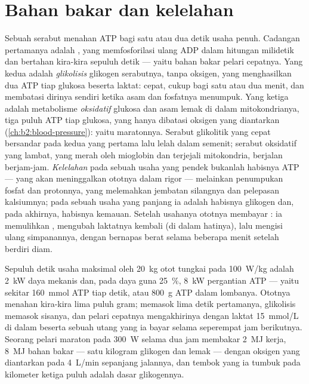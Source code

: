 \section{Bahan bakar dan kelelahan}

\begin{proposition}\label{prop:b2:muscle-movement:energy}
Sebuah serabut menahan ATP bagi satu atau dua detik usaha penuh.
Cadangan pertamanya adalah \emph{}, yang memfosforilasi
ulang ADP dalam hitungan milidetik dan bertahan kira-kira sepuluh detik
--- yaitu bahan bakar pelari cepatnya. Yang kedua adalah
\emph{glikolisis} glikogen serabutnya, tanpa oksigen, yang menghasilkan
dua ATP tiap glukosa beserta laktat: cepat, cukup bagi satu atau dua
menit, dan membatasi dirinya sendiri ketika asam dan fosfatnya
menumpuk. Yang ketiga adalah metabolisme \emph{oksidatif} glukosa dan
asam lemak di dalam mitokondrianya, tiga puluh ATP tiap glukosa, yang
hanya dibatasi oksigen yang diantarkan 
(\cref{ch:b2:blood-pressure}): yaitu maratonnya. Serabut glikolitik
yang cepat bersandar pada kedua yang pertama lalu lelah dalam semenit;
serabut oksidatif yang lambat, yang merah oleh mioglobin dan terjejali
mitokondria, berjalan berjam-jam. \emph{Kelelahan} pada sebuah usaha
yang pendek bukanlah habisnya ATP --- yang akan meninggalkan ototnya
dalam rigor --- melainkan penumpukan fosfat dan protonnya, yang
melemahkan jembatan silangnya dan pelepasan kalsiumnya; pada sebuah
usaha yang panjang ia adalah habisnya glikogen dan, pada akhirnya,
habisnya kemauan. Setelah usahanya ototnya membayar \emph{}: ia memulihkan , mengubah laktatnya
kembali (di dalam hatinya), lalu mengisi ulang simpanannya, dengan
bernapas berat selama beberapa menit setelah berdiri diam.
\end{proposition}

\begin{example}\label{ex:b2:muscle-movement:sprint}
Sepuluh detik usaha maksimal oleh \qty{20}{kg} otot tungkai pada
\qty{100}{W/kg} adalah \qty{2}{kW} daya mekanis dan, pada daya guna
\qty{25}{\%}, \qty{8}{kW} pergantian ATP --- yaitu sekitar
\qty{160}{mmol} ATP tiap detik, atau \qty{800}{g} ATP dalam lombanya.
Ototnya menahan kira-kira lima puluh gram;  memasok lima
detik pertamanya, glikolisis memasok sisanya, dan pelari cepatnya
mengakhirinya dengan laktat \qty{15}{mmol/L} di dalam  beserta
sebuah utang yang ia bayar selama seperempat jam berikutnya. Seorang
pelari maraton pada \qty{300}{W} selama dua jam membakar \qty{2}{MJ}
kerja, \qty{8}{MJ} bahan bakar --- satu kilogram glikogen dan lemak ---
dengan oksigen yang diantarkan pada \qty{4}{L/min} sepanjang jalannya,
dan tembok yang ia tumbuk pada kilometer ketiga puluh adalah dasar
glikogennya.
\end{example}

